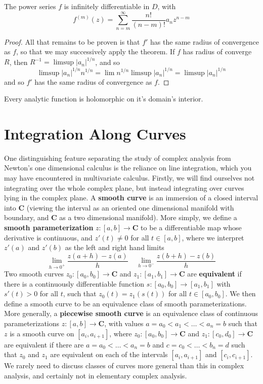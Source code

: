 \begin{corollary}
    The power series $f$ is infinitely differentiable in $D$, with
    \[ f^{(m)}(z) = \sum_{n = m}^\infty \frac{n!}{(n - m)!} a_n z^{n-m} \]
\end{corollary}
\begin{proof}
    All that remains to be proven is that $f'$ has the same radius of convergence as $f$, so that we may successively apply the theorem. If $f$ has radius of converge $R$, then $R^{-1} = \limsup |a_n|^{1/n}$, and so
    \[ \limsup |a_n|^{1/n} n^{1/n} = \lim n^{1/n} \limsup |a_n|^{1/n} = \limsup |a_n|^{1/n} \]
    and so $f'$ has the same radius of convergence as $f$.
\end{proof}

\begin{corollary}
    Every analytic function is holomorphic on it's domain's interior.
\end{corollary}











\section{Integration Along Curves}

One distinguishing feature separating the study of complex analysis from Newton's one dimensional calculus is the reliance on line integration, which you may have encountered in multivariate calculus. Firstly, we will find ourselves not integrating over the whole complex plane, but instead integrating over curves lying in the complex plane. A {\bf smooth curve} is an immersion of a closed interval into $\mathbf{C}$ (viewing the interval as an oriented one dimensional manifold with boundary, and $\mathbf{C}$ as a two dimensional manifold). More simply, we define a {\bf smooth parameterization} $z: [a,b] \to \mathbf{C}$ to be a differentiable map whose derivative is continuous, and $z'(t) \neq 0$ for all $t \in [a,b]$, where we interpret $z'(a)$ and $z'(b)$ as the left and right hand limits
%
\[ \lim_{h \to 0^+} \frac{z(a + h) - z(a)}{h}\ \ \ \ \ \lim_{h \to 0^-} \frac{z(b + h) - z(b)}{h} \]
%
Two smooth curves $z_0: [a_0,b_0] \to \mathbf{C}$ and $z_1: [a_1,b_1] \to \mathbf{C}$ are {\bf equivalent} if there is a continuously differentiable function $s: [a_0,b_0] \to [a_1,b_1]$ with $s'(t) > 0$ for all $t$, such that $z_0(t) = z_1(s(t))$ for all $t \in [a_0,b_0]$. We then define a smooth curve to be an equivalence class of smooth parameterizations. More generally, a {\bf piecewise smooth curve} is an equivalence class of continuous parameterizations $z: [a,b] \to \mathbf{C}$, with values $a = a_0 < a_1 < \dots < a_n = b$ such that $z$ is a smooth curve on $[a_i,a_{i+1}]$, where $z_0: [a_0,b_0] \to \mathbf{C}$ and $z_1:[c_0,d_0] \to \mathbf{C}$ are equivalent if there are $a = a_0 < \dots < a_n = b$ and $c = c_0 < \dots < b_n = d$ such that $z_0$ and $z_1$ are equivalent on each of the intervals $[a_i,a_{i+1}]$ and $[c_i,c_{i+1}]$. We rarely need to discuss classes of curves more general than this in complex analysis, and certainly not in elementary complex analysis.

